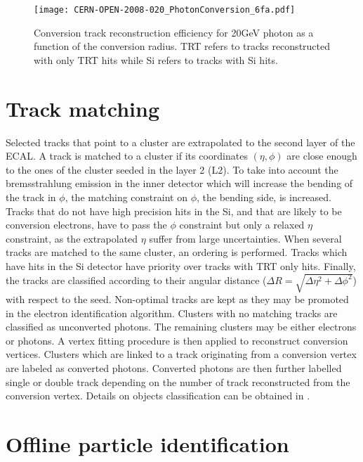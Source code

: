 \begin{figure}
\centering
  \texttt{[image: CERN-OPEN-2008-020\_PhotonConversion\_6fa.pdf]}
  \caption{Conversion track reconstruction efficiency for 20GeV photon as a function of the conversion radius.
    TRT refers to tracks reconstructed with only TRT hits while Si refers to tracks with Si hits. \cite{CERN-OPEN-2008-020}}
  \label{fig:Calibration_Reconstruction_TrackReconstruction}
\end{figure}

\section{Track matching}
\label{sec:orge39d41a}

Selected tracks that point to a cluster are extrapolated to the second layer of the ECAL.
A track is matched to a cluster if its coordinates \((\eta,\phi)\) are close enough to the ones of the cluster seeded in the layer 2 (L2).
To take into account the bremsstrahlung emission in the inner detector which will increase the bending of the track in $\phi$, the matching constraint on $\phi$, the bending side, is increased.
Tracks that do not have high precision hits in the Si, and that are likely to be conversion electrons, have to pass the $\phi$ constraint but only a relaxed $\eta$ constraint, as the extrapolated $\eta$ suffer from large uncertainties.
When several tracks are matched to the same cluster, an ordering is performed.
Tracks which have hits in the Si detector have priority over tracks with TRT only hits.
Finally, the tracks are classified according to their angular distance (\(\Delta R = \sqrt{\Delta\eta^2 +\Delta\phi^2}\)) with respect to the seed.
Non-optimal tracks are kept as they may be promoted in the electron identification algorithm.
Clusters with no matching tracks are classified as unconverted photons.
The remaining clusters may be either electrons or photons.
A vertex fitting procedure is then applied to reconstruct conversion vertices.
Clusters which are linked to a track originating from a conversion vertex are labeled as converted photons.
Converted photons are then further labelled single or double track depending on the number of track reconstructed from the conversion vertex.
Details on objects classification can be obtained in \cite{TrackMatching}.


\section{Offline particle identification}
\label{sec:orga90f716}

